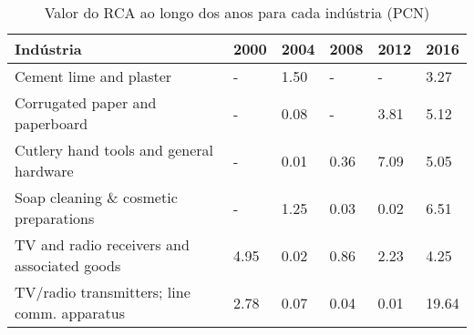 \begin{table}
\centering
\caption{Valor do RCA ao longo dos anos para cada indústria (PCN)}
\begin{tabular}{p{6cm}p{1.5cm}p{1.5cm}p{1.5cm}p{1.5cm}p{1.5cm}}
\toprule
                                  Indústria & 2000 & 2004 & 2008 & 2012 &  2016 \\
\midrule
                    Cement lime and plaster &    - & 1.50 &    - &    - &  3.27 \\
            Corrugated paper and paperboard &    - & 0.08 &    - & 3.81 &  5.12 \\
    Cutlery hand tools and general hardware &    - & 0.01 & 0.36 & 7.09 &  5.05 \\
      Soap cleaning \& cosmetic preparations &    - & 1.25 & 0.03 & 0.02 &  6.51 \\
TV and radio receivers and associated goods & 4.95 & 0.02 & 0.86 & 2.23 &  4.25 \\
TV/radio transmitters; line comm. apparatus & 2.78 & 0.07 & 0.04 & 0.01 & 19.64 \\
\bottomrule
\end{tabular}
\end{table}
